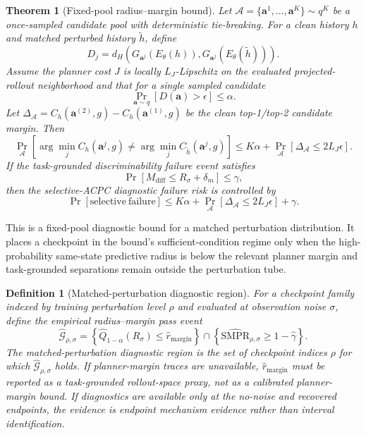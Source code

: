 \documentclass[10pt]{article}
\newtheorem{theorem}{Theorem}
\newtheorem{definition}{Definition}
\begin{document}
\begin{theorem}[Fixed-pool radius--margin bound]\label{thm:radius-margin-certificate}
Let $\mathcal A=\{\mathbf a^1,\ldots,\mathbf a^K\}\sim q^K$ be a once-sampled candidate pool with deterministic tie-breaking. For a clean history $h$ and matched perturbed history $\tilde h$, define
\[
D_j=d_H\!\left(G_{\mathbf a^j}(E_\theta(h)),G_{\mathbf a^j}(E_\theta(\tilde h))\right).
\]
Assume the planner cost $J$ is locally $L_J$-Lipschitz on the evaluated projected-rollout neighborhood and that for a single sampled candidate
\[
\Pr_{\mathbf a\sim q}[D(\mathbf a)>\epsilon]\le \alpha.
\]
Let $\Delta_{\mathcal A}=C_h(\mathbf a^{(2)},g)-C_h(\mathbf a^{(1)},g)$ be the clean top-1/top-2 candidate margin. Then
\[
\Pr_{\mathcal A}\!\left[
\arg\min_j C_h(\mathbf a^j,g)
\ne
\arg\min_j C_{\tilde h}(\mathbf a^j,g)
\right]
\le
K\alpha + \Pr_{\mathcal A}[\Delta_{\mathcal A}\le 2L_J\epsilon].
\]
If the task-grounded discriminability failure event satisfies
\[
\Pr[M_{\mathrm{diff}}\le R_\sigma+\delta_m]\le \gamma,
\]
then the selective-ACPC diagnostic failure risk is controlled by
\[
\Pr[\mathrm{selective\ failure}]
\le
K\alpha + \Pr_{\mathcal A}[\Delta_{\mathcal A}\le 2L_J\epsilon] + \gamma.
\]
\end{theorem}

This is a fixed-pool diagnostic bound for a matched perturbation distribution. It places a checkpoint in the bound's sufficient-condition regime only when the high-probability same-state predictive radius is below the relevant planner margin and task-grounded separations remain outside the perturbation tube.

\begin{definition}[Matched-perturbation diagnostic region]\label{def:robust-interval}
For a checkpoint family indexed by training perturbation level $\rho$ and evaluated at observation noise $\sigma$, define the empirical radius--margin pass event
\[
\widehat{\mathcal G}_{\rho,\sigma}
=
\left\{\widehat Q_{1-\alpha}(R_\sigma) \le \widehat r_{\mathrm{margin}}\right\}
\cap
\left\{\widehat{\mathrm{SMPR}}_{\rho,\sigma}\ge 1-\widehat\gamma\right\}.
\]
The matched-perturbation diagnostic region is the set of checkpoint indices $\rho$ for which $\widehat{\mathcal G}_{\rho,\sigma}$ holds. If planner-margin traces are unavailable, $\widehat r_{\mathrm{margin}}$ must be reported as a task-grounded rollout-space proxy, not as a calibrated planner-margin bound. If diagnostics are available only at the no-noise and recovered endpoints, the evidence is endpoint mechanism evidence rather than interval identification.
\end{definition}
\end{document}
